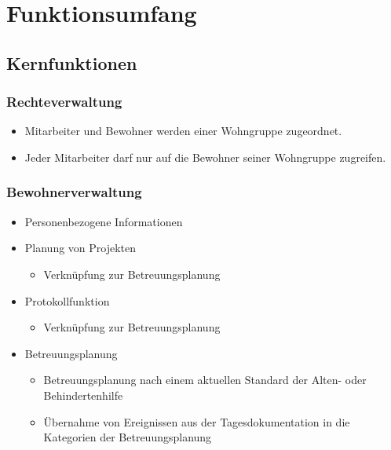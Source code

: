 \documentclass[a4paper,10pt]{article}
\begin{document}
\section{Funktionsumfang}
\subsection{Kernfunktionen}
\subsubsection{Rechteverwaltung}
\begin{itemize}
	\item Mitarbeiter und Bewohner werden einer Wohngruppe zugeordnet.
	\item Jeder Mitarbeiter darf nur auf die Bewohner seiner Wohngruppe zugreifen.
\end{itemize}
\subsubsection{Bewohnerverwaltung}
\begin{itemize}
	\item Personenbezogene Informationen
	\item Planung von Projekten
	\begin{itemize}
		\item Verknüpfung zur Betreuungsplanung
	\end{itemize}
	\item Protokollfunktion
	\begin{itemize}
		\item Verknüpfung zur Betreuungsplanung
	\end{itemize}
	\item  Betreuungsplanung
	\begin{itemize}
		\item Betreuungsplanung nach einem aktuellen Standard der Alten- oder Behindertenhilfe
		\item Übernahme von Ereignissen aus der Tagesdokumentation in die Kategorien der Betreuungsplanung
	\end{itemize}
\end{itemize}
\end{document}
